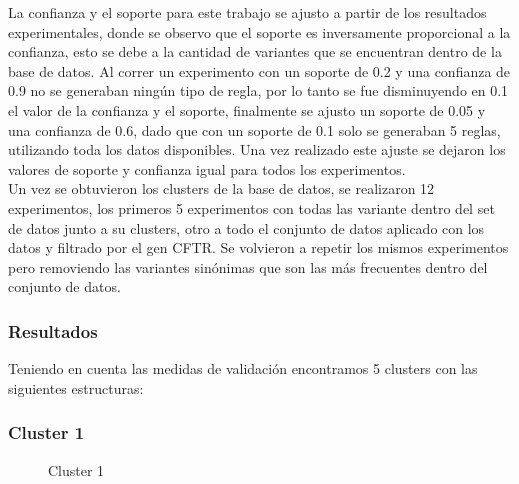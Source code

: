 La confianza y el soporte para este trabajo se ajusto a partir de los resultados experimentales, donde se observo que el soporte es inversamente proporcional a la confianza, esto se debe a la cantidad de variantes que se encuentran dentro de la base de datos. Al correr un experimento con un soporte de 0.2 y una confianza de 0.9 no se generaban ningún tipo de regla, por lo tanto se fue disminuyendo en 0.1 el valor de la confianza y el soporte, finalmente se ajusto un soporte de 0.05 y una confianza de 0.6, dado que con un soporte de 0.1 solo se generaban 5 reglas, utilizando toda los datos disponibles. Una vez realizado este ajuste se dejaron los valores de soporte y confianza igual para todos los experimentos.\\

Un vez se obtuvieron los clusters de la base de datos, se realizaron 12 experimentos, los primeros 5 experimentos con todas las variante dentro del set de datos  junto a su clusters, otro a todo el conjunto de datos aplicado con  los datos y filtrado por el gen CFTR. Se volvieron a repetir los mismos experimentos pero removiendo las variantes sinónimas que son las más frecuentes dentro del conjunto de datos.


\subsubsection{Resultados} 

Teniendo en cuenta las medidas de validación encontramos  5 clusters con las siguientes estructuras:

\subsubsection*{Cluster 1}

\begin{figure}[H]
	\centering
	\label{f:nube1}
	\caption{Cluster 1} \label{fig:cluster1}
\end{figure} 

